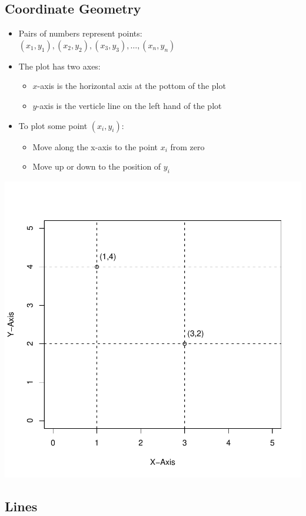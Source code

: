 \documentclass[20pt]{extarticle}
\newcommand{\bi}{\begin{itemize}}
\newcommand{\ei}{\end{itemize}}
\begin{document}
\subsection{Coordinate Geometry}
\bi
\item Pairs of numbers represent points: $(x_1, y_1), (x_2, y_2),
  (x_3, y_3), \ldots, (x_n, y_n)$
\item The plot has two axes:
\bi
\item $x$-axis is the horizontal axis at the pottom of the plot
\item $y$-axis is the verticle line on the left hand of the plot
\ei 
\item To plot some point $(x_i, y_i)$:
\bi
\item Move along the x-axis to the point $x_i$ from zero
\item Move up or down to the position of $y_i$ 
\ei
\ei
\begin{center}
\includegraphics[scale = .8]{graph_example}
\end{center}

\subsection{Lines}
\end{document}
